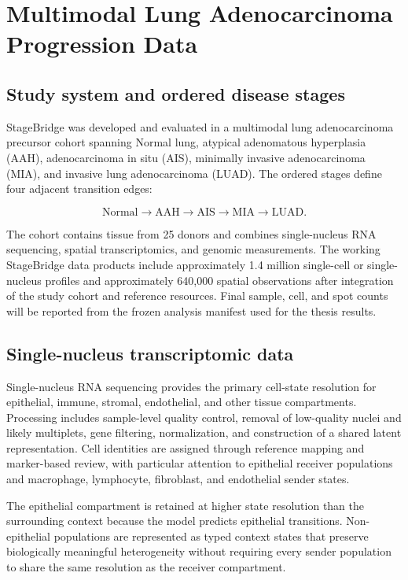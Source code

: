 \chapter{Multimodal Lung Adenocarcinoma Progression Data} \label{chap:data}

\section{Study system and ordered disease stages}

StageBridge was developed and evaluated in a multimodal lung adenocarcinoma precursor cohort spanning Normal lung, atypical adenomatous hyperplasia (AAH), adenocarcinoma in situ (AIS), minimally invasive adenocarcinoma (MIA), and invasive lung adenocarcinoma (LUAD). The ordered stages define four adjacent transition edges:

\begin{equation}
\mathrm{Normal}\rightarrow\mathrm{AAH}\rightarrow\mathrm{AIS}\rightarrow\mathrm{MIA}\rightarrow\mathrm{LUAD}.
\label{eq:stage-sequence}
\end{equation}

The cohort contains tissue from 25 donors and combines single-nucleus RNA sequencing, spatial transcriptomics, and genomic measurements. The working StageBridge data products include approximately 1.4 million single-cell or single-nucleus profiles and approximately 640,000 spatial observations after integration of the study cohort and reference resources. Final sample, cell, and spot counts will be reported from the frozen analysis manifest used for the thesis results.

\section{Single-nucleus transcriptomic data}

Single-nucleus RNA sequencing provides the primary cell-state resolution for epithelial, immune, stromal, endothelial, and other tissue compartments. Processing includes sample-level quality control, removal of low-quality nuclei and likely multiplets, gene filtering, normalization, and construction of a shared latent representation. Cell identities are assigned through reference mapping and marker-based review, with particular attention to epithelial receiver populations and macrophage, lymphocyte, fibroblast, and endothelial sender states.

The epithelial compartment is retained at higher state resolution than the surrounding context because the model predicts epithelial transitions. Non-epithelial populations are represented as typed context states that preserve biologically meaningful heterogeneity without requiring every sender population to share the same resolution as the receiver compartment.

